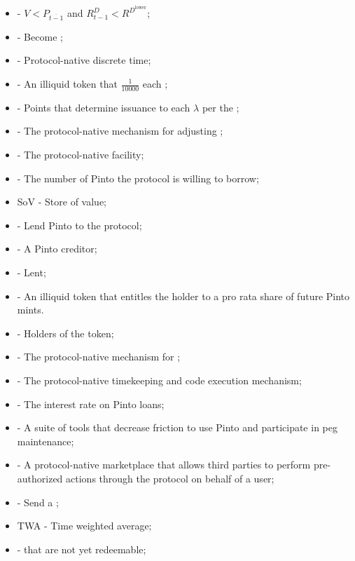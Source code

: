 \documentclass[class=article, crop=false]{standalone}
\begin{document}
\begin{itemize}[topsep=0pt, itemsep=3pt,leftmargin=16pt]
    \item[]  - $V < P_{\overline{t-1}}$ and $R_{t-1}^{D} < R^{D^{\text{lower}}}$;
    \item[]  - Become ;
    \item[]  - Protocol-native discrete time;
    \item[]  - An illiquid token that  $\frac{1}{10000}$  each ;
    \item[]  - Points that determine  issuance to each $\lambda$ per the ;
    \item[]  - The protocol-native mechanism for adjusting ;
    \item[]  - The protocol-native  facility;
    \item[]  - The number of Pinto the protocol is willing to borrow;
    \item[] SoV - Store of value;
    \item[]  - Lend Pinto to the protocol;
    \item[]  - A Pinto creditor;
    \item[]  - Lent;
    \item[]  - An illiquid token that entitles the holder to a pro rata share of future Pinto mints.
    \item[]  - Holders of the  token;
    \item[]  - The protocol-native mechanism for ;
    \item[]  - The protocol-native timekeeping and code execution mechanism;
    \item[]  - The interest rate on Pinto loans;
    \item[]  - A suite of tools that decrease friction to use Pinto and participate in peg maintenance;
    \item[]  - A protocol-native marketplace that allows third parties to perform pre-authorized actions through the protocol on behalf of a user;
    \item[]  - Send a ;
    \item[] TWA - Time weighted average;
    \item[]  -  that are not yet redeemable;

\end{itemize}
\end{document}

